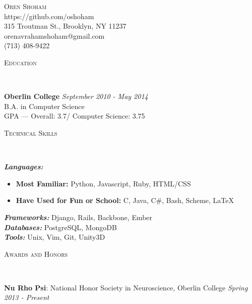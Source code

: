 \documentclass[9pt]{article}
\newenvironment{changemargin}[2]{%
  \begin{list}{}{%
    \setlength{\topsep}{0pt}%
    \setlength{\leftmargin}{#1}%
    \setlength{\rightmargin}{#2}%
    \setlength{\listparindent}{\parindent}%
    \setlength{\itemindent}{\parindent}%
    \setlength{\parsep}{\parskip}%
  }%
  \item[]}{\end{list}
}
\newcommand{\lineover}{
	\begin{changemargin}{-0.05in}{-0.05in}
		\vspace*{-8pt}
		\hrulefill \\
		\vspace*{-2pt}
	\end{changemargin}
}
\newcommand{\header}[1]{
	\begin{changemargin}{-0.5in}{-0.5in}
		\scshape{#1}\\
  	\lineover
	\end{changemargin}
}
\newcommand{\contact}[5]{
	\begin{changemargin}{-0.5in}{-0.5in}
		\begin{center}
			{\Large \scshape {#1}}\\ \smallskip
			{#2}\\ \smallskip 
			{#3}\\ \smallskip
			{#4} \\ \smallskip
			{#5}\smallskip
		\end{center}
	\end{changemargin}
}
\newenvironment{body} {
	\vspace*{-16pt}
	\begin{changemargin}{-0.25in}{-0.5in}
  }	
	{\end{changemargin}
}
\begin{document}

\contact{Oren Shoham}{https://github.com/oshoham}{315 Troutman St., Brooklyn, NY 11237}{orenavrahamshoham@gmail.com}{(713) 408-9422}


\header{Education}

\begin{body}
	\vspace{14pt}
	\textbf{Oberlin College}{} \hfill \emph{September 2010 - May 2014}{} \\
	B.A. in Computer Science \\
	GPA --- Overall: 3.7/ Computer Science: 3.75 \\
\end{body}

\smallskip

\header{Technical Skills}

\begin{body}
	\vspace{14pt}
	\emph{\textbf{Languages:}}{} 
		\begin{itemize} \itemsep -0pt  %
			\item \textbf{Most Familiar:} Python, Javascript, Ruby, HTML/CSS
			\item \textbf{Have Used for Fun or School:} C, Java, C\#, Bash, Scheme, \LaTeX \\
		\end{itemize}
	\medskip
	\emph{\textbf{Frameworks:}}{} Django, Rails, Backbone, Ember \\
	\medskip
	\emph{\textbf{Databases:}}{} PostgreSQL, MongoDB \\
	\medskip
	\emph{\textbf{Tools:}}{} Unix, Vim, Git, Unity3D \\
\end{body}

\smallskip

\header{Awards and Honors}

\begin{body}
	\vspace{14pt}
	\textbf{Nu Rho Psi}: National Honor Society in Neuroscience, Oberlin College \hfill{} \emph{Spring 2013 - Present}\\
	\smallskip
\end{body}
\end{document}

